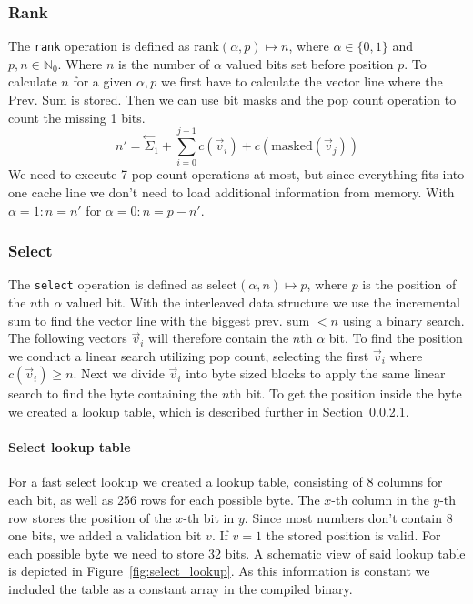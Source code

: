 \documentclass[a4paper,UKenglish,cleveref, autoref, thm-restate]{lipics-v2021}
\def\code#1{\texttt{#1}}
\newcommand\prevsum[0]{\ensuremath{\overset{\leftarrow}{\Sigma}_1}}
\begin{document}
\subsubsection{Rank}
The \code{rank} operation is defined as $\text{rank}(\alpha, p) \mapsto n$, where $\alpha \in \{0,1\}$
and $p,n \in \mathbb{N}_0$. Where $n$ is the number of $\alpha$ valued bits set before position $p$.
To calculate $n$ for a given $\alpha, p$ we first have to calculate the vector line where the Prev. Sum
is stored. Then we can use bit masks and the pop count operation to count the missing 1 bits.
$$
    n' = \prevsum + \sum_{i=0}^{j-1}c(\vec{v}_i) + c(\text{masked}(\vec{v}_j)) 
$$
We need to execute 7 pop count operations at most, but since everything fits into one cache line
we don't need to load additional information from memory. With $\alpha = 1: n = n'$ for $\alpha = 0: n = p - n'$.

\subsubsection{Select}
The \code{select} operation is defined as $\text{select}(\alpha, n) \mapsto p$, where $p$ is the position
of the $n$th $\alpha$ valued bit. With the interleaved data structure we use the incremental sum
to find the vector line with the biggest prev. sum $< n$ using a binary search.
The following vectors $\vec{v}_i$ will therefore contain the $n$th $\alpha$ bit.
To find the position we conduct a linear search utilizing pop count, selecting the first
$\vec{v}_i$ where $c(\vec{v}_i) \geq n$. Next we divide $\vec{v}_i$ into byte sized blocks to apply 
the same linear search to find the byte containing the $n$th bit.
To get the position inside the byte we created a lookup table, which is described further in Section~\ref{p:select_lookup}.

\paragraph{Select lookup table}
\label{p:select_lookup}
For a fast select lookup we created a lookup table, consisting of 8 columns for each bit,
as well as 256 rows for each possible byte.
The $x$-th column in the $y$-th row stores the position of the $x$-th bit in $y$.
Since most numbers don't contain 8 one bits, we added a validation bit $v$.
If $v = 1$ the stored position is valid. For each possible byte we need to store 32 bits.
A schematic view of said lookup table is depicted in Figure~\ref{fig:select_lookup}.
As this information is constant we included the table as a constant array in the compiled binary.
\end{document}
